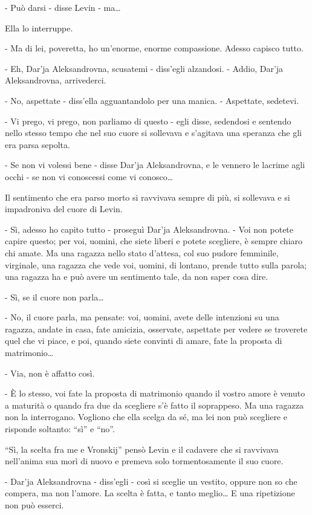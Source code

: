 - Può darsi - disse Levin - ma\ldots{} 

Ella lo interruppe. 

- Ma di lei, poveretta, ho un'enorme, enorme compassione. Adesso capisco tutto. 

- Eh, Dar'ja Aleksandrovna, scusatemi - diss'egli alzandosi. - Addio, Dar'ja Aleksandrovna, arrivederci. 

- No, aspettate - diss'ella agguantandolo per una manica. - Aspettate, sedetevi. 

- Vi prego, vi prego, non parliamo di questo - egli disse, sedendosi e sentendo nello stesso tempo che nel suo cuore si sollevava e s'agitava una speranza che gli era parsa sepolta. 

- Se non vi volessi bene - disse Dar'ja Aleksandrovna, e le vennero le lacrime agli occhi - se non vi conoscessi come vi conosco\ldots{} 

Il sentimento che era parso morto si ravvivava sempre di più, si sollevava e si impadroniva del cuore di Levin. 

- Sì, adesso ho capito tutto - proseguì Dar'ja Aleksandrovna. - Voi non potete capire questo; per voi, uomini, che siete liberi e potete scegliere, è sempre chiaro chi amate. Ma una ragazza nello stato d'attesa, col suo pudore femminile, virginale, una ragazza che vede voi, uomini, di lontano, prende tutto sulla parola; una ragazza ha e può avere un sentimento tale, da non saper cosa dire. 

- Sì, se il cuore non parla\ldots{} 

- No, il cuore parla, ma pensate: voi, uomini, avete delle intenzioni su una ragazza, andate in casa, fate amicizia, osservate, aspettate per vedere se troverete quel che vi piace, e poi, quando siete convinti di amare, fate la proposta di matrimonio\ldots{} 

- Via, non è affatto così. 

- È lo stesso, voi fate la proposta di matrimonio quando il vostro amore è venuto a maturità o quando fra due da scegliere s'è fatto il soprappeso. Ma una ragazza non la interrogano. Vogliono che ella scelga da sé, ma lei non può scegliere e risponde soltanto: ``sì'' e ``no''. 

``Sì, la scelta fra me e Vronskij'' pensò Levin e il cadavere che si ravvivava nell'anima sua morì di nuovo e premeva solo tormentosamente il suo cuore. 

- Dar'ja Aleksandrovna - diss'egli - così si sceglie un vestito, oppure non so che compera, ma non l'amore. La scelta è fatta, e tanto meglio\ldots{} E una ripetizione non può esserci. 

